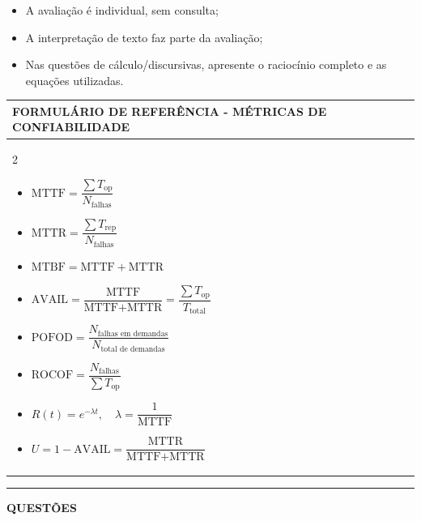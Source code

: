 \documentclass[12pt,a4paper]{article}
\begin{document}
\begin{itemize}
    \item A avaliação é individual, sem consulta;
    \item A interpretação de texto faz parte da avaliação;
    \item Nas questões de cálculo/discursivas, apresente o raciocínio completo e as equações utilizadas.
\end{itemize}

\vspace{0.2cm}

\begin{center}
\begin{tabularx}{\textwidth}{|X|}
\hline
\cellcolor{gray!20}\centering \textbf{FORMULÁRIO DE REFERÊNCIA - MÉTRICAS DE CONFIABILIDADE} \tabularnewline
\hline
\vspace{0.1cm}
\begin{multicols}{2}
\small
\begin{itemize}[leftmargin=*,itemsep=3pt]
    \item $\text{MTTF} = \dfrac{\sum T_{\text{op}}}{N_{\text{falhas}}}$
    \item $\text{MTTR} = \dfrac{\sum T_{\text{rep}}}{N_{\text{falhas}}}$
    \item $\text{MTBF} = \text{MTTF} + \text{MTTR}$
    \item $\text{AVAIL} = \dfrac{\text{MTTF}}{\text{MTTF} + \text{MTTR}} = \dfrac{\sum T_{\text{op}}}{T_{\text{total}}}$
    \item $\text{POFOD} = \dfrac{N_{\text{falhas em demandas}}}{N_{\text{total de demandas}}}$
    \item $\text{ROCOF} = \dfrac{N_{\text{falhas}}}{\sum T_{\text{op}}}$
    \item $R(t) = e^{-\lambda t}, \quad \lambda = \dfrac{1}{\text{MTTF}}$
    \item $U = 1 - \text{AVAIL} = \dfrac{\text{MTTR}}{\text{MTTF} + \text{MTTR}}$
\end{itemize}
\end{multicols}
\vspace{-0.2cm}
\tabularnewline
\hline
\end{tabularx}
\end{center}

\vspace{0.3cm}

\begin{center}
    \rule{\textwidth}{0.4pt}
    \textbf{QUESTÕES}
\end{center}
\end{document}
